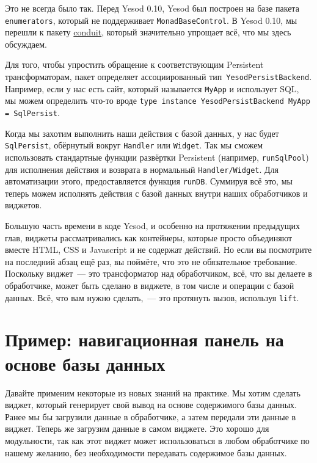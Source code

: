 \begin{remark}
Это не всегда было так. Перед Yesod 0.10, Yesod был построен на базе пакета
\texttt{enumerators}, который не поддерживает \lstinline'MonadBaseControl'. В
Yesod 0.10, мы перешли к пакету
\href{http://hackage.haskell.org/package/conduit}{conduit}\footnotemark, который
значительно упрощает всё, что мы здесь обсуждаем.
\end{remark}

Для того, чтобы упростить обращение к соответствующим Persistent
трансформаторам, пакет
определяет ассоциированный тип~\lstinline'YesodPersistBackend'. Например, если у
нас есть сайт, который называется \lstinline'MyApp' и использует SQL, мы можем
определить что-то вроде
\lstinline'type instance YesodPersistBackend MyApp = SqlPersist'.

Когда мы захотим выполнить наши действия с базой данных, у нас будет
\lstinline'SqlPersist', обёрнутый вокруг \lstinline'Handler' или
\lstinline'Widget'. Так мы сможем использовать стандартные функции развёртки
Persistent (например, \lstinline'runSqlPool') для исполнения действия и возврата
в нормальный \lstinline'Handler/Widget'. Для автоматизации этого,
предоставляется функция \lstinline'runDB'. Суммируя всё это, мы теперь можем
исполнять действия с базой данных внутри наших обработчиков и виджетов.

Большую часть времени в коде Yesod, и особенно на протяжении предыдущих глав,
виджеты рассматривались как контейнеры, которые просто объединяют вместе HTML,
CSS и Javascript и не содержат действий. Но если вы посмотрите на последний
абзац ещё раз, вы поймёте, что это не обязательное требование. Поскольку
виджет~--- это трансформатор над обработчиком, всё, что вы делаете в
обработчике, может быть сделано в виджете, в том числе и операции с базой
данных. Всё, что вам нужно сделать,~--- это протянуть вызов, используя
\lstinline'lift'.

\section{Пример: навигационная панель на основе базы данных}
Давайте применим некоторые из новых знаний на практике. Мы хотим сделать виджет,
который генерирует свой вывод на основе содержимого базы данных. Ранее мы бы
загрузили данные в обработчике, а затем передали эти данные в виджет. Теперь же
загрузим данные в самом виджете. Это хорошо для модульности, так как этот виджет
может использоваться в любом обработчике по нашему желанию, без необходимости
передавать содержимое базы данных.

